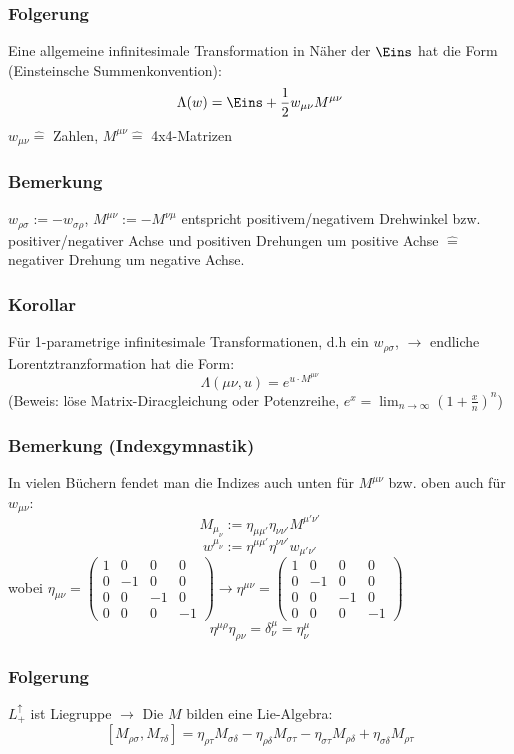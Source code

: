 \documentclass[twoside,a4paper]{scrartcl}
\renewcommand{\1}{\mathds{1}}
\newcommand{\ra}{\rightarrow}
\newcommand{\entspricht}{\mathrel{\widehat{=}}}
\renewcommand{\L}{\Lambda}
\begin{document}
\subsubsection*{Folgerung}
Eine allgemeine infinitesimale Transformation in Näher der $\Eins$ hat die Form (Einsteinsche Summenkonvention):
$$\L(w)=\Eins+\frac{1}{2} w_{\mu\nu}M^{\mu\nu}$$
$w_{\mu\nu}\entspricht$ Zahlen, $M^{\mu\nu}\entspricht$ 4x4-Matrizen
\subsubsection*{Bemerkung}
$w_{\rho\sigma}:=-w_{\sigma\rho}$, $M^{\mu\nu}:=-M^{\nu\mu}$ entspricht positivem/negativem Drehwinkel bzw. positiver/negativer Achse und positiven Drehungen um positive Achse $\entspricht$ negativer Drehung um negative Achse.
\subsubsection*{Korollar}
Für 1-parametrige infinitesimale Transformationen, d.h ein $w_{\rho\sigma}$, $\ra$ endliche Lorentztranzformation hat die Form:
$$\L(\mu\nu,u)=e^{u \cdot M^{\mu\nu}}$$
(Beweis: löse Matrix-Diracgleichung oder Potenzreihe, $e^x=\lim_{n \ra \infty} (1+\frac{x}{n})^n$)
\subsubsection*{Bemerkung (Indexgymnastik)}
In vielen Büchern fendet man die Indizes auch unten für $M^{\mu\nu}$ bzw. oben auch für $w_{\mu\nu}$:
$$M_{\mu_\nu}:=\eta_{\mu\mu'}\eta_{\nu\nu'}M^{\mu'\nu'}$$
$$w^{\mu_\nu}:=\eta^{\mu\mu'}\eta^{\nu\nu'}w_{\mu'\nu'}$$
wobei $\eta_{\mu\nu}=\begin{pmatrix}1 & 0& 0& 0 \\ 0 & -1 & 0& 0 \\ 0 & 0& -1 & 0 \\ 0& 0& 0& -1\end{pmatrix} \ra \eta^{\mu\nu}=\begin{pmatrix}1 & 0& 0& 0 \\ 0 & -1 & 0& 0 \\ 0 & 0& -1 & 0 \\ 0& 0& 0& -1\end{pmatrix}$
$$\eta^{\mu\rho}\eta_{\rho\nu}=\delta_\nu^\mu= \eta_\nu^\mu$$
\subsubsection*{Folgerung}
$L_+^\uparrow$ ist Liegruppe $\ra$ Die $M$ bilden eine Lie-Algebra:
$$[M_{\rho\sigma},M_{\tau\delta}]=\eta_{\rho\tau}M_{\sigma\delta}-\eta_{\rho\delta}M_{\sigma\tau}-\eta_{\sigma\tau}M_{\rho\delta}+\eta_{\sigma\delta}M_{\rho\tau}$$
\end{document}
